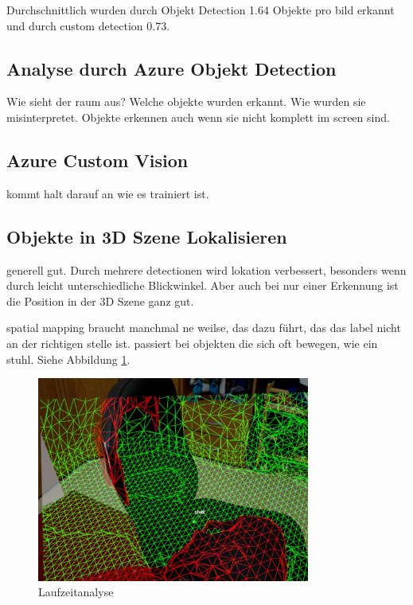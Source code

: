 Durchschnittlich wurden durch Objekt Detection 1.64 Objekte pro bild erkannt und durch custom detection 0.73.

\subsection{Analyse durch Azure Objekt Detection}

Wie sieht der raum aus?
Welche objekte wurden erkannt. 
Wie wurden sie misinterpretet.
Objekte erkennen auch wenn sie nicht komplett im screen sind.

\subsection{Azure Custom Vision}

kommt halt darauf an wie es trainiert ist. 

\subsection{Objekte in 3D Szene Lokalisieren}

generell gut. Durch mehrere detectionen wird lokation verbessert, besonders wenn durch leicht unterschiedliche Blickwinkel. Aber auch bei nur einer Erkennung ist die Position in der 3D Szene ganz gut. 


spatial mapping braucht manchmal ne weilse, das dazu führt, das das label nicht an der richtigen stelle ist.
passiert bei objekten die sich oft bewegen, wie ein stuhl. Siehe Abbildung \ref{img:stuhl}.
\begin{figure}[H]
	\centering
	\includegraphics[width=0.8\textwidth]{images/ML_20201004_19.18.02.jpg}
	\caption[]{Laufzeitanalyse }
	\label{img:stuhl}
\end{figure}

